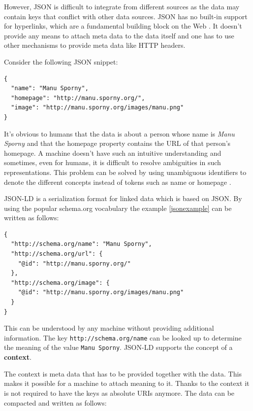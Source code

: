 However, JSON is difficult to integrate from different sources as the data may contain keys that conflict with other data sources. JSON has no built-in support for hyperlinks, which are a fundamental building block on the Web \citep{jsonldbasicconcepts}. It doesn't provide any means to attach meta data to the data itself and one has to use other mechanisms to provide meta data like HTTP headers.

Consider the following JSON snippet:

\lstset{language=JSON}
\begin{lstlisting}[caption=Data of a person in the JSON format, label=jsonexample]
{
  "name": "Manu Sporny",
  "homepage": "http://manu.sporny.org/",
  "image": "http://manu.sporny.org/images/manu.png"
}
\end{lstlisting}

It's obvious to humans that the data is about a person whose name is \textit{Manu Sporny} and that the homepage property contains the URL of that person's homepage. A machine doesn't have such an intuitive understanding and sometimes, even for humans, it is difficult to resolve ambiguities in such representations. This problem can be solved by using unambiguous identifiers to denote the different concepts instead of tokens such as name or homepage \citep{jsonldbasicconcepts}.

JSON-LD is a serialization format for linked data which is based on JSON. By using the popular schema.org vocabulary the example \ref{jsonexample} can be written as follows:

\lstset{language=JSON}
\begin{lstlisting}[caption=Data of a person in the JSON-LD format, label=jsonldexample]
{
  "http://schema.org/name": "Manu Sporny",
  "http://schema.org/url": {
    "@id": "http://manu.sporny.org/"
  },
  "http://schema.org/image": {
    "@id": "http://manu.sporny.org/images/manu.png"
  }
}
\end{lstlisting}

This can be understood by any machine without providing additional information. The key \lstinline{http://schema.org/name} can be looked up to determine the meaning of the value \lstinline{Manu Sporny}. JSON-LD supports the concept of a \textbf{context}.

The context is meta data that has to be provided together with the data. This makes it possible for a machine to attach meaning to it. Thanks to the context it is not required to have the keys as absolute URIs anymore. The data can be compacted and written as follows:

